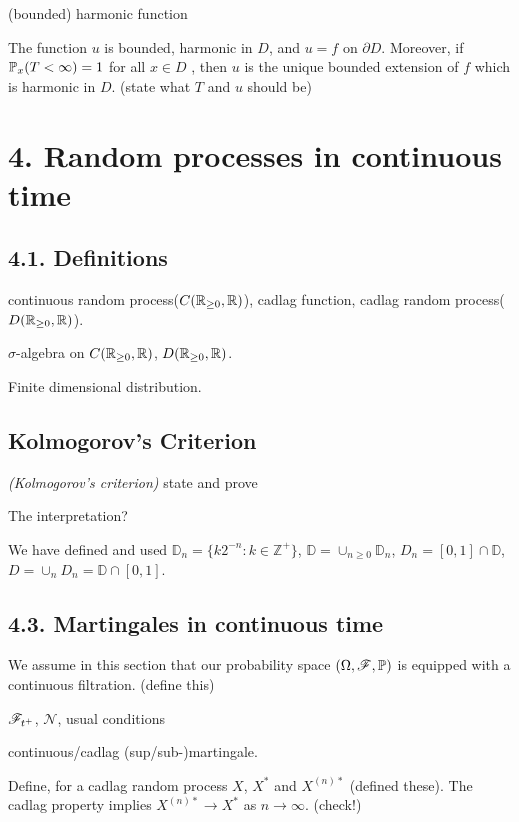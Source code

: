 \documentclass[10pt,a4paper]{report}
\begin{document}
(bounded) harmonic function
\s

 The function $u$ is bounded, harmonic in $D$, and $u=f$ on $\partial D$. Moreover, if $\mathbb{P}_x (T<\infty) =1 $ for all $x\in D$ , then $u$ is the unique bounded extension of $f$ which is harmonic in $D$. (state what $T$ and $u$ should be)

\section*{4. Random processes in continuous time}

\subsection*{4.1. Definitions}

continuous random process($C(\mathbb{R}_{\geq 0}, \mathbb{R})$), cadlag function, cadlag random process($D(\mathbb{R}_{\geq 0}, \mathbb{R})$).

$\sigma$-algebra on $C(\mathbb{R}_{\geq 0}, \mathbb{R})$, $D(\mathbb{R}_{\geq 0}, \mathbb{R})$.

Finite dimensional distribution.

\subsection*{Kolmogorov's Criterion}

 \emph{(Kolmogorov's criterion)} state and prove
\s

The interpretation?
\s

We have defined and used $\mathbb{D}_n = \{k2^{-n} : k\in \mathbb{Z}^+ \}$, $\mathbb{D} = \cup_{n\geq 0}\mathbb{D}_n$, $D_n = [0,1] \cap \mathbb{D}$, $D= \cup_n D_n = \mathbb{D} \cap [0,1]$.

\subsection*{4.3. Martingales in continuous time}

We assume in this section that our probability space $(\Omega, \mathscr{F}, \mathbb{P})$ is equipped with a continuous filtration. (define this)

\quad $\mathscr{F}_{t^+}$, $\mathscr{N}$, usual conditions

\quad continuous/cadlag (sup/sub-)martingale.

\quad Define, for a cadlag random process $X$, $X^*$ and $X^{(n)*}$ (defined these). The cadlag property implies $X^{(n)*} \rightarrow X^*$ as $n\rightarrow \infty$. (check!)
\s
\end{document}
